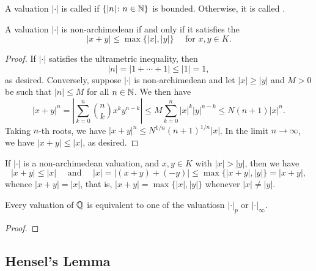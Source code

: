 \begin{definition}
    A valuation $|\cdot|$ is called  if $\{|n|\colon n\in\mathbb{N}\}$ is bounded. Otherwise, it is called .
\end{definition}

\begin{proposition}
    A valuation $|\cdot|$ is non-archimedean if and only if it satisfies the 
    \begin{equation*}
        |x + y|\le\max\{|x|, |y|\}\quad\text{ for }x,y\in K.
    \end{equation*}
\end{proposition}
\begin{proof}
    If $|\cdot|$ satisfies the ultrametric inequality, then 
    \begin{equation*}
        |n| = |1 + \cdots + 1|\le |1| = 1,
    \end{equation*}
    as desired. Conversely, suppose $|\cdot|$ is non-archimedean and let $|x|\ge |y|$ and $M > 0$ be such that $|n|\le M$ for all $n\in\mathbb{N}$. We then have 
    \begin{equation*}
        |x + y|^n = \left|\sum_{k = 0}^n\binom{n}{k}x^k y^{n - k}\right|\le M\sum_{k = 0}^n |x|^k |y|^{n - k}\le N(n + 1)|x|^n.
    \end{equation*}
    Taking $n$-th roots, we have $|x + y|^n\le N^{1/n}(n + 1)^{1/n}|x|$. In the limit $n\to\infty$, we have $|x + y|\le |x|$, as desired.
\end{proof}

\begin{remark}
    If $|\cdot|$ is a non-archimedean valuation, and $x,y\in K$ with $|x| > |y|$, then we have 
    \begin{equation*}
        |x + y|\le |x|\quad\text{ and }\quad |x| = |(x + y) + (-y)|\le\max\{|x + y|, |y|\} = |x + y|,
    \end{equation*}
    whence $|x + y| = |x|$, that is, $|x + y| = \max\{|x|, |y|\}$ whenever $|x|\ne |y|$.
\end{remark}

\begin{theorem}[Ostrowski]
    Every valuation of $\mathbb{Q}$ is equivalent to one of the valuatiosn $|\cdot|_p$ or $|\cdot|_\infty$.
\end{theorem}
\begin{proof}
    
\end{proof}

\subsection{Hensel's Lemma}


